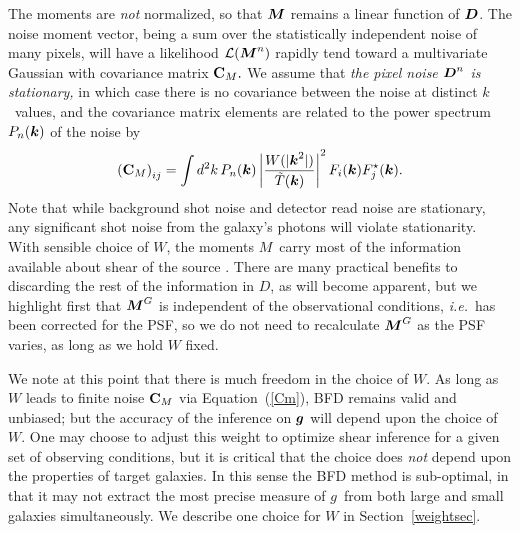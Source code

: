\documentclass[11pt,preprint,flushrt]{aastex}
\def\eqq#1{Equation~(\ref{#1})}
\newcommand\ie{{\it i.e.\/}}
\newcommand{\vecD}{\mbox{\boldmath $D$}}
\newcommand{\vecg}{\mbox{\boldmath $g$}}
\newcommand{\vecM}{\mbox{\boldmath $M$}}
\newcommand{\veck}{\mbox{\boldmath $k$}}
\newcommand{\matC}{\mbox{$\bf C$}}
\newcommand{\likeli}{\mbox{$\mathcal{L}$}}
\newcommand\edit[1]{#1}
\begin{document}
The moments are \emph{not} normalized, so that 
$\vecM$ remains a linear function of $\vecD$. The noise moment vector,
being a sum over the statistically independent noise of many pixels,
will have a likelihood $\likeli(\vecM^n)$ rapidly tend toward a multivariate Gaussian 
with covariance matrix $\matC_M.$  We assume that \emph{the pixel
  noise $\vecD^n$ is stationary,} in which case there is no covariance
between the noise at distinct \veck\ values, and the covariance matrix
elements are related to the power spectrum $P_n(\veck)$ of the noise by
\begin{equation}
\left(\matC_M\right)_{ij} = 
\int d^2k\, P_n(\veck) \left| \frac{W(|\veck^2|)}{\tilde T(\veck)}
\right|^2 F_i(\veck) F^\star_j(\veck).
\label{Cm}
\end{equation}
Note that while background shot noise and detector
read noise are stationary, any significant shot noise from the
galaxy's photons will violate stationarity.  With sensible choice of
$W$, the moments \vecM\ carry most of the information available about
shear of the source \citep{bj02}.  There are many practical benefits to
discarding the rest of the information in \vecD, as will become
apparent, but we highlight first that $\vecM^G$ is
independent of the observational conditions, \ie\ has been corrected
for the PSF, so we do not need to recalculate $\vecM^G$ as the PSF
varies, as long as we hold $W$ fixed.

\edit{We note at this point that there is much freedom in the choice
  of $W$.  As long as $W$ leads to finite noise $\matC_M$ via
  \eqq{Cm}, BFD remains valid and unbiased; but the accuracy of the
  inference on $\vecg$ will depend upon the choice of $W$.  One may
  choose to adjust this weight to optimize shear inference for a given
  set of observing conditions, but it is critical that the choice does
  \emph{not} depend upon the properties of target galaxies.  In this
  sense the BFD method is sub-optimal, in that it may not
  extract the most precise measure of \vecg\ from both
  large and small galaxies simultaneously.  We
  describe one choice for $W$ in Section~\ref{weightsec}.}
\end{document}
